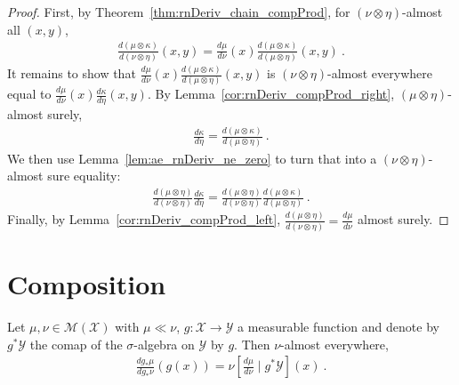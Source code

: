 \begin{proof} \leanok
{}
First, by Theorem~\ref{thm:rnDeriv_chain_compProd}, for $(\nu \otimes \eta)$-almost all $(x,y)$,
\begin{align*}
\frac{d(\mu \otimes \kappa)}{d(\nu \otimes \eta)}(x, y)
= \frac{d \mu}{d \nu}(x) \frac{d(\mu \otimes \kappa)}{d(\mu \otimes \eta)}(x, y)
\: .
\end{align*}
It remains to show that $\frac{d \mu}{d \nu}(x) \frac{d(\mu \otimes \kappa)}{d(\mu \otimes \eta)}(x, y)$ is $(\nu \otimes \eta)$-almost everywhere equal to $\frac{d\mu}{d\nu}(x)\frac{d \kappa}{d \eta}(x,y)$.
By Lemma~\ref{cor:rnDeriv_compProd_right}, $(\mu \otimes \eta)$-almost surely,
\begin{align*}
\frac{d \kappa}{d \eta} = \frac{d (\mu \otimes \kappa)}{d (\mu \otimes \eta)}
\: .
\end{align*}
We then use Lemma~\ref{lem:ae_rnDeriv_ne_zero} to turn that into a $(\nu \otimes \eta)$-almost sure equality:
\begin{align*}
\frac{d(\mu \otimes \eta)}{d(\nu \otimes \eta)}\frac{d \kappa}{d \eta} = \frac{d(\mu \otimes \eta)}{d(\nu \otimes \eta)}\frac{d (\mu \otimes \kappa)}{d (\mu \otimes \eta)}
\: .
\end{align*}
Finally, by Lemma~\ref{cor:rnDeriv_compProd_left}, $\frac{d(\mu \otimes \eta)}{d(\nu \otimes \eta)} = \frac{d\mu}{d\nu}$ almost surely.
\end{proof}


\section{Composition}


\begin{lemma}
  \label{lem:rnDeriv_map_eq_condexp}
  \leanok
  \uses{}
  Let $\mu, \nu \in \mathcal M(\mathcal X)$ with $\mu \ll \nu$, $g : \mathcal X \to \mathcal Y$ a measurable function and denote by $g^* \mathcal Y$ the comap of the $\sigma$-algebra on $\mathcal Y$ by $g$.
  Then $\nu$-almost everywhere,
  \begin{align*}
  \frac{d g_*\mu}{d g_*\nu}(g(x)) = \nu\left[ \frac{d \mu}{d \nu} \mid g^* \mathcal Y\right](x)
  \: .
  \end{align*}
\end{lemma}


